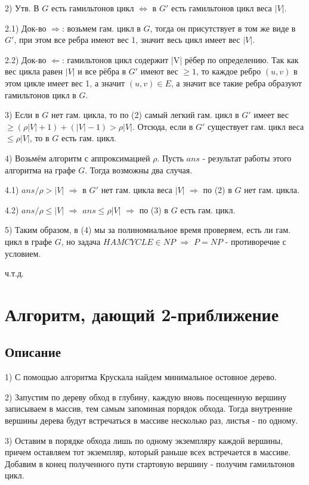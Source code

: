 \documentclass[a4paper,12pt]{article}
\begin{document}
2) Утв. В $G$ есть гамильтонов цикл $\Leftrightarrow$ в $G'$ есть гамильтонов цикл веса $|V|$.

2.1) Док-во $\Rightarrow$: возьмем гам. цикл в $G$, тогда он присутствует в том же виде в $G'$, при этом все ребра имеют вес 1, значит весь цикл имеет вес $|V|$.

2.2) Док-во $\Leftarrow$: гамильтонов цикл содержит |V| рёбер по определению. Так как вес цикла равен $|V|$ и все рёбра в $G'$ имеют вес $\geq 1$, то каждое ребро $(u, v)$ в этом цикле имеет вес 1, а значит $(u ,v) \in E$, а значит все такие ребра образуют гамильтонов цикл в $G$.

3) Если в $G$ нет гам. цикла, то по (2) самый легкий гам. цикл в $G'$ имеет вес $\geq (\rho|V| + 1) + (|V| - 1) > \rho|V|$. Отсюда, если в $G'$ существует гам. цикл веса $ \leq \rho|V|$, то в $G$ есть гам. цикл.

4) Возьмём алгоритм с аппроксимацией $\rho$. Пусть $ans$ - результат работы этого алгоритма на графе $G$. Тогда возможны два случая.

4.1) $ans / \rho > |V|$ $\Rightarrow$ в $G'$ нет гам. цикла веса  $|V|$ $\Rightarrow$ по (2) в $G$ нет гам. цикла.

4.2) $ans / \rho \leq |V|$ $\Rightarrow$ $ans \leq \rho|V|$ $\Rightarrow$ по (3) в $G$ есть гам. цикл.

5) Таким образом, в (4) мы за полиномиальное время проверяем, есть ли гам. цикл в графе $G$, но задача $HAMCYCLE \in NP$ $\Rightarrow$ $P = NP$ - противоречие с условием.

ч.т.д.

\section{Алгоритм, дающий 2-приближение}

\subsection{Описание}

1) С помощью алгоритма Крускала найдем минимальное остовное дерево.

2) Запустим по дереву обход в глубину, каждую вновь посещенную вершину записываем в массив, тем самым запоминая порядок обхода. Тогда внутренние вершины дерева будут встречаться в массиве несколько раз, листья - по одному.

3) Оставим в порядке обхода лишь по одному экземпляру каждой вершины, причем оставляем тот экземпляр, который раньше всех встречается в массиве. Добавим в конец полученного пути стартовую вершину - получим гамильтонов цикл.
\end{document}
